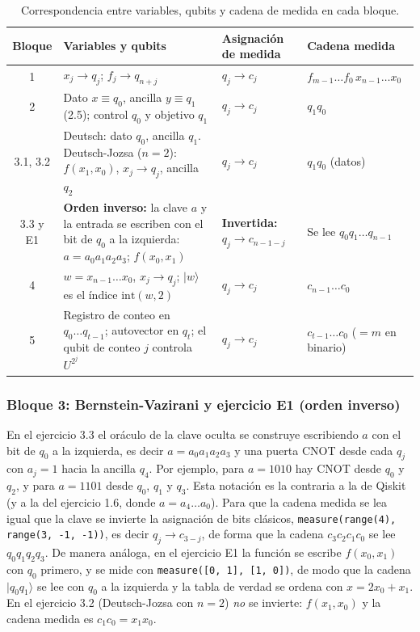 \begin{table}[htbp]
    \centering
    {\small\setlength{\tabcolsep}{4pt}
    \begin{tabular}{c|p{}|p{}|p{}}
    \hline
    Bloque & Variables y qubits & Asignación de medida & Cadena medida \\
    \hline
    1 & $x_j\to q_j$; $f_j\to q_{n+j}$ & $q_j\to c_j$ & $f_{m-1}\dots f_0\,x_{n-1}\dots x_0$ \\
    2 & Dato $x\equiv q_0$, ancilla $y\equiv q_1$ (2.5); control $q_0$ y objetivo $q_1$ & $q_j\to c_j$ & $q_1q_0$ \\
    3.1, 3.2 & Deutsch: dato $q_0$, ancilla $q_1$. Deutsch-Jozsa ($n=2$): $f(x_1,x_0)$, $x_j\to q_j$, ancilla $q_2$ & $q_j\to c_j$ & $q_1q_0$ (datos) \\
    3.3 y E1 & \textbf{Orden inverso:} la clave $a$ y la entrada se escriben con el bit de $q_0$ a la izquierda: $a=a_0a_1a_2a_3$; $f(x_0,x_1)$ & \textbf{Invertida:} $q_j\to c_{n-1-j}$ & Se lee $q_0q_1\dots q_{n-1}$ \\
    4 & $w=x_{n-1}\dots x_0$, $x_j\to q_j$; $|w\rangle$ es el índice $\mathrm{int}(w,2)$ & $q_j\to c_j$ & $c_{n-1}\dots c_0$ \\
    5 & Registro de conteo en $q_0\dots q_{t-1}$; autovector en $q_t$; el qubit de conteo $j$ controla $U^{2^j}$ & $q_j\to c_j$ & $c_{t-1}\dots c_0$ ($=m$ en binario) \\
    \hline
    \end{tabular}}
    \caption{Correspondencia entre variables, qubits y cadena de medida en cada bloque.}\label{tab:entorno_convenios}
\end{table}

\subsubsection*{Bloque 3: Bernstein-Vazirani y ejercicio E1 (orden inverso)}
En el ejercicio 3.3 el oráculo de la clave oculta se construye escribiendo $a$ con el bit de $q_0$ a la izquierda, es decir $a=a_0a_1a_2a_3$ y una puerta CNOT desde
cada $q_j$ con $a_j=1$ hacia la ancilla $q_4$. Por ejemplo, para $a=1010$ hay CNOT desde $q_0$ y $q_2$, y para $a=1101$ desde $q_0$, $q_1$ y $q_3$. Esta notación es la contraria
a la de Qiskit (y a la del ejercicio 1.6, donde $a=a_4\dots a_0$). Para que la cadena medida se lea igual que la clave se invierte la asignación de bits clásicos,
\texttt{measure(range(4), range(3, -1, -1))}, es decir $q_j\to c_{3-j}$, de forma que la cadena $c_3c_2c_1c_0$ se lee $q_0q_1q_2q_3$. De manera análoga, en el ejercicio E1
la función se escribe $f(x_0,x_1)$ con $q_0$ primero, y se mide con \texttt{measure([0, 1], [1, 0])}, de modo que la cadena $|q_0q_1\rangle$ se lee con $q_0$ a la izquierda
y la tabla de verdad se ordena con $x=2x_0+x_1$. En el ejercicio 3.2 (Deutsch-Jozsa con $n=2$) \emph{no} se invierte: $f(x_1,x_0)$ y la cadena medida es $c_1c_0=x_1x_0$.

